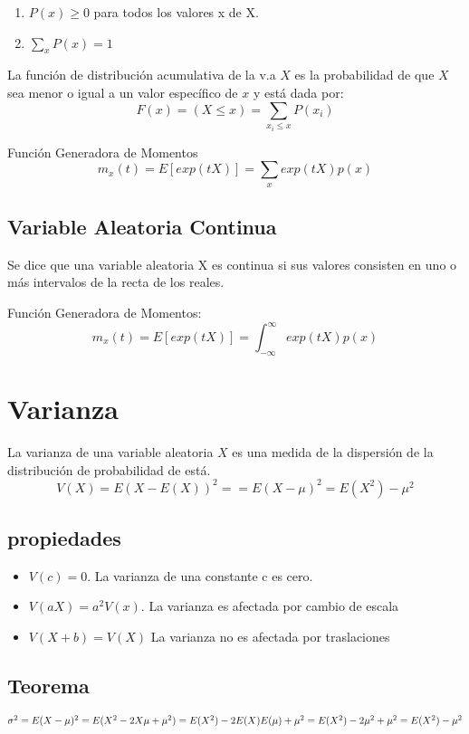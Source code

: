 \documentclass{book}
\begin{document}
\begin{enumerate}
    \item $P(x)\geq 0$ para todos los valores x de X.
    \item $\underset{x}{\sum}P(x)=1$
\end{enumerate}


La función de distribución acumulativa de la v.a $X$ es la probabilidad de que $X$ sea menor o igual a un valor específico de $x$ y está dada por: $$F(x)=(X\leq x)=\underset{x_i \leq x}{\sum} P(x_i)$$

Función Generadora de Momentos
$$m_x(t)=E[exp(tX)]=\underset{x}{\sum}exp(tX)p(x)$$


\subsection{Variable Aleatoria Continua} Se dice que una variable aleatoria X es continua si sus valores consisten en uno o más intervalos de la recta de los reales. 

Función Generadora de Momentos:
$$m_x(t)=E[exp(tX)]=\int_{-\infty}^\infty exp(tX)p(x)$$

\section{Varianza}
La varianza de una variable aleatoria $X$ es una medida  de la dispersión de la distribución de probabilidad de está.\\

$$V(X) = E(X - E(X))^2 = =  E(X-\mu)^2 =E(X^2)- \mu^2$$
 

\subsection{propiedades}

\begin{itemize}
    \item $V(c) = 0$. La varianza de una constante c es cero.
    \item $V(aX) = a^2V(x)$. La varianza es afectada por cambio de escala
    \item $V(X+b) = V(X)$ La varianza no es afectada por traslaciones
\end{itemize}

\subsection{Teorema}

$\sigma^2=  E(X-\mu)^2 \\
 = E(X^2 - 2X\mu +\mu^2) \\
 =E(X^2)-2E(X)E(\mu) + \mu^2\\
 =E(X^2)-2\mu^2 +\mu^2 \\
 =E(X^2)- \mu^2$
\end{document}
